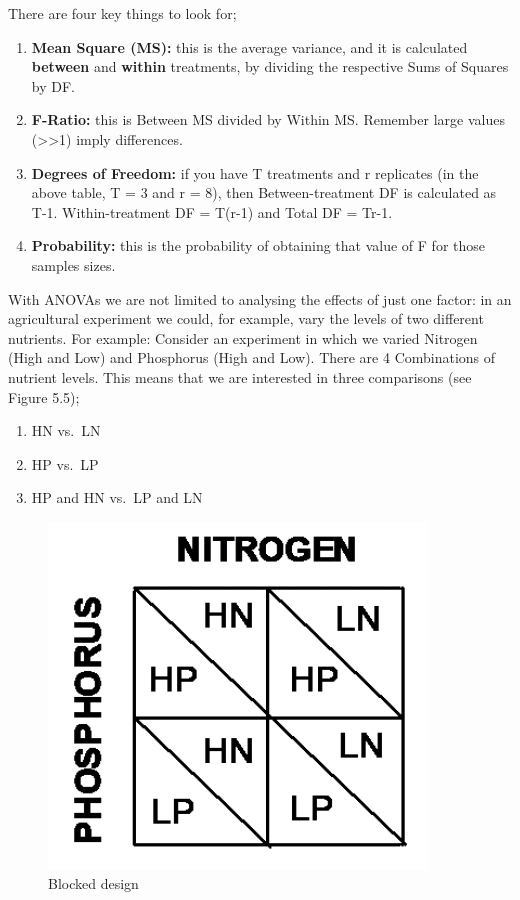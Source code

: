 \documentclass[
]{book}
\providecommand{\tightlist}{%
  \setlength{\itemsep}{0pt}\setlength{\parskip}{0pt}}
\begin{document}
There are four key things to look for;

\begin{enumerate}
\def\labelenumi{\arabic{enumi})}
\tightlist
\item
  \textbf{Mean Square (MS):} this is the average variance, and it is calculated \textbf{between} and \textbf{within} treatments, by dividing the respective Sums of Squares by DF.
\item
  \textbf{F-Ratio:} this is Between MS divided by Within MS. Remember large values (\textgreater\textgreater1) imply differences.
\item
  \textbf{Degrees of Freedom:} if you have T treatments and r replicates (in the above table, T = 3 and r = 8), then Between-treatment DF is calculated as T-1. Within-treatment DF = T(r-1) and Total DF = Tr-1.
\item
  \textbf{Probability:} this is the probability of obtaining that value of F for those samples sizes.
\end{enumerate}

With ANOVAs we are not limited to analysing the effects of just one factor: in an agricultural experiment we could, for example, vary the levels of two different nutrients. For example:
Consider an experiment in which we varied Nitrogen (High and Low) and Phosphorus (High and Low). There are 4 Combinations of nutrient levels. This means that we are interested in three comparisons (see Figure 5.5);

\begin{enumerate}
\def\labelenumi{\arabic{enumi})}
\tightlist
\item
  HN vs.~LN
\item
  HP vs.~LP
\item
  HP and HN vs.~LP and LN
\end{enumerate}

\begin{figure}
\includegraphics[width=0.4\linewidth]{figures/nitrogen_phosphorus} \caption{Blocked design}\label{fig:unnamed-chunk-47}
\end{figure}
\end{document}
